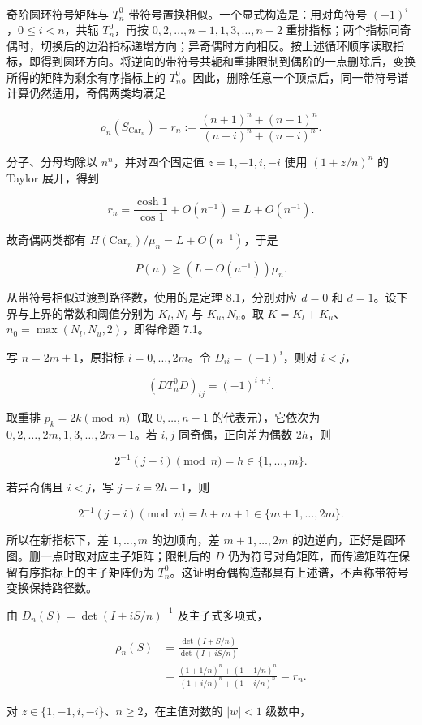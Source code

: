 \documentclass[11pt,a4paper]{article}
\begin{document}
奇阶圆环符号矩阵与 \(T_n^0\) 带符号置换相似。一个显式构造是：用对角符号 \((-1)^i\)，\(0\le i<n\)，共轭 \(T_n^0\)，再按 \(0,2,\ldots,n-1,1,3,\ldots,n-2\) 重排指标；两个指标同奇偶时，切换后的边沿指标递增方向；异奇偶时方向相反。按上述循环顺序读取指标，即得到圆环方向。将逆向的带符号共轭和重排限制到偶阶的一点删除后，变换所得的矩阵为剩余有序指标上的 \(T_n^0\)。因此，删除任意一个顶点后，同一带符号谱计算仍然适用，奇偶两类均满足

\[
\rho_n(S_{\mathrm{Car}_n})
=r_n:=\frac{(n+1)^n+(n-1)^n}{(n+i)^n+(n-i)^n}.
\]

分子、分母均除以 \(n^n\)，并对四个固定值 \(z=1,-1,i,-i\) 使用 \((1+z/n)^n\) 的 Taylor 展开，得到

\[
r_n=\frac{\cosh1}{\cos1}+O(n^{-1})=L+O(n^{-1}).
\]

故奇偶两类都有 \(H(\mathrm{Car}_n)/\mu_n=L+O(n^{-1})\)，于是

\[
P(n)\ge(L-O(n^{-1}))\mu_n.
\]

从带符号相似过渡到路径数，使用的是定理 8.1，分别对应 \(d=0\) 和 \(d=1\)。设下界与上界的常数和阈值分别为 \(K_l,N_l\) 与 \(K_u,N_u\)。取 \(K=K_l+K_u\)、\(n_0=\max(N_l,N_u,2)\)，即得命题 7.1。

写 \(n=2m+1\)，原指标 \(i=0,\ldots,2m\)。令 \(D_{ii}=(-1)^i\)，则对 \(i<j\)，

\[
(DT_n^0D)_{ij}=(-1)^{i+j}.
\]

取重排 \(p_k=2k\pmod n\)（取 \(0,\ldots,n-1\) 的代表元），它依次为 \(0,2,\ldots,2m,1,3,\ldots,2m-1\)。若 \(i,j\) 同奇偶，正向差为偶数 \(2h\)，则

\[
2^{-1}(j-i)\pmod n=h\in\{1,\ldots,m\}.
\]

若异奇偶且 \(i<j\)，写 \(j-i=2h+1\)，则

\[
2^{-1}(j-i)\pmod n=h+m+1\in\{m+1,\ldots,2m\}.
\]

所以在新指标下，差 \(1,\ldots,m\) 的边顺向，差 \(m+1,\ldots,2m\) 的边逆向，正好是圆环图。删一点时取对应主子矩阵；限制后的 \(D\) 仍为符号对角矩阵，而传递矩阵在保留有序指标上的主子矩阵仍为 \(T_n^0\)。这证明奇偶构造都具有上述谱，不声称带符号变换保持路径数。

由 \(D_n(S)=\det(I+iS/n)^{-1}\) 及主子式多项式，

\[
\begin{aligned}
\rho_n(S)&=\frac{\det(I+S/n)}{\det(I+iS/n)}\\
&=\frac{(1+1/n)^n+(1-1/n)^n}
{(1+i/n)^n+(1-i/n)^n}=r_n.
\end{aligned}
\]

对 \(z\in\{1,-1,i,-i\}\)、\(n\ge2\)，在主值对数的 \(|w|<1\) 级数中，
\end{document}
